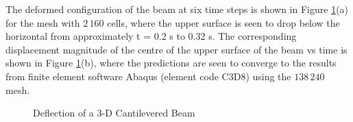 \documentclass[sn-mathphys,Numbered]{sn-jnl}%
\begin{document}
The deformed configuration of the beam at six time steps is shown in Figure \ref{fig:dynamic_cantilever}(a) for the mesh with $2\,160$ cells, where the upper surface is seen to drop below the horizontal from approximately t = 0.2 s to 0.32 s.
The corresponding displacement magnitude of the centre of the upper surface of the beam vs time is shown in Figure \ref{fig:dynamic_cantilever}(b), where the predictions are seen to converge to the results from finite element software Abaqus (element code C3D8) using the $138\,240$ mesh.
\begin{figure}[htbp]
   \centering
	 \quad
   \caption{Deflection of a 3-D Cantilevered Beam}
   \label{fig:dynamic_cantilever}
\end{figure}

\end{document}
